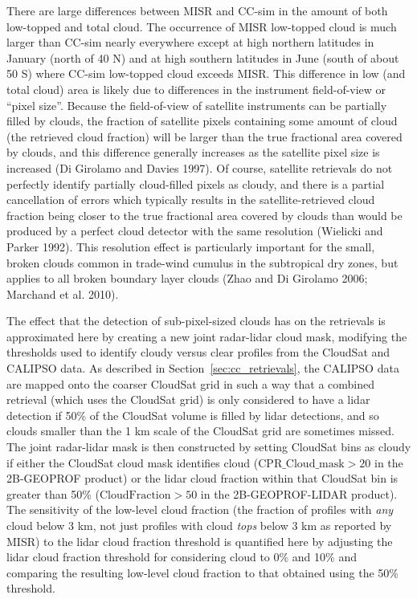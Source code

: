 There are large differences between MISR and CC-sim in the amount of
both low-topped and total cloud. The occurrence of MISR low-topped cloud
is much larger than CC-sim nearly everywhere except at high northern
latitudes in January (north of 40 N) and at high southern latitudes in
June (south of about 50 S) where CC-sim low-topped cloud exceeds MISR.
This difference in low (and total cloud) area is likely due to
differences in the instrument field-of-view or ``pixel size''. Because
the field-of-view of satellite instruments can be partially filled by
clouds, the fraction of satellite pixels containing some amount of cloud
(the retrieved cloud fraction) will be larger than the true fractional
area covered by clouds, and this difference generally increases as the
satellite pixel size is increased (Di Girolamo and Davies 1997). Of
course, satellite retrievals do not perfectly identify partially
cloud-filled pixels as cloudy, and there is a partial cancellation of
errors which typically results in the satellite-retrieved cloud fraction
being closer to the true fractional area covered by clouds than would be
produced by a perfect cloud detector with the same resolution (Wielicki
and Parker 1992). This resolution effect is particularly important for
the small, broken clouds common in trade-wind cumulus in the subtropical
dry zones, but applies to all broken boundary layer clouds (Zhao and Di
Girolamo 2006; Marchand et al. 2010).

The effect that the detection of sub-pixel-sized clouds has on the
retrievals is approximated here by creating a new joint radar-lidar
cloud mask, modifying the thresholds used to identify cloudy versus
clear profiles from the CloudSat and CALIPSO data. As described in
Section~\ref{sec:cc_retrievals}, the CALIPSO data are mapped onto the
coarser CloudSat grid in such a way that a combined retrieval (which
uses the CloudSat grid) is only considered to have a lidar detection if
50\% of the CloudSat volume is filled by lidar detections, and so clouds
smaller than the 1 km scale of the CloudSat grid are sometimes missed.
The joint radar-lidar mask is then constructed by setting CloudSat bins
as cloudy if either the CloudSat cloud mask identifies cloud
(\(\textrm{CPR\_Cloud\_mask} > 20\) in the 2B-GEOPROF product) or the
lidar cloud fraction within that CloudSat bin is greater than 50\%
(\(\textrm{CloudFraction} > 50\) in the 2B-GEOPROF-LIDAR product). The
sensitivity of the low-level cloud fraction (the fraction of profiles
with \emph{any} cloud below 3 km, not just profiles with cloud
\emph{tops} below 3 km as reported by MISR) to the lidar cloud fraction
threshold is quantified here by adjusting the lidar cloud fraction
threshold for considering cloud to 0\% and 10\% and comparing the
resulting low-level cloud fraction to that obtained using the 50\%
threshold.

